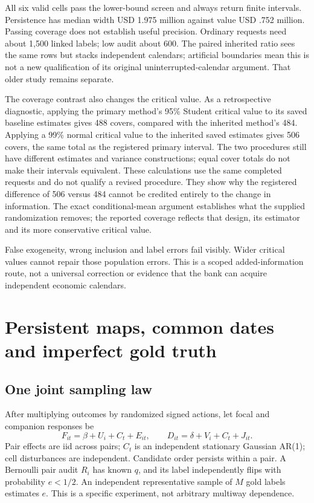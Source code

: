 All six valid cells pass the lower-bound screen and always return finite intervals. Persistence has median width USD 1.975 million against value USD .752 million. Passing coverage does not establish useful precision. Ordinary requests need about 1,500 linked labels; low audit about 600. The paired inherited ratio sees the same rows but stacks independent calendars; artificial boundaries mean this is not a new qualification of its original uninterrupted-calendar argument. That older study remains separate.

The coverage contrast also changes the critical value. As a retrospective
diagnostic, applying the primary method's 95\% Student critical value to its
saved baseline estimates gives 488 covers, compared with the inherited
method's 484. Applying a 99\% normal critical value to the inherited saved
estimates gives 506 covers, the same total as the registered primary interval.
The two procedures still have different estimates and variance constructions;
equal cover totals do not make their intervals equivalent. These calculations
use the same completed requests and do not qualify a revised procedure.
They show why the registered difference of 506 versus 484 cannot be credited
entirely to the change in information. The exact conditional-mean argument
establishes what the supplied randomization removes; the reported coverage
reflects that design, its estimator and its more conservative critical value.

False exogeneity, wrong inclusion and label errors fail visibly. Wider critical values cannot repair those population errors. This is a scoped added-information route, not a universal correction or evidence that the bank can acquire independent economic calendars.

\section{Persistent maps, common dates and imperfect gold truth}
\subsection{One joint sampling law}
After multiplying outcomes by randomized signed actions, let focal and companion responses be
\[
 F_{it}=\beta+U_i+C_t+E_{it},\qquad D_{it}=\delta+V_i+C_t+J_{it}.
\]
Pair effects are iid across pairs; $C_t$ is an independent stationary Gaussian AR(1); cell disturbances are independent. Candidate order persists within a pair. A Bernoulli pair audit $R_i$ has known $q$, and its label independently flips with probability $e<1/2$. An independent representative sample of $M$ gold labels estimates $e$. This is a specific experiment, not arbitrary multiway dependence.


